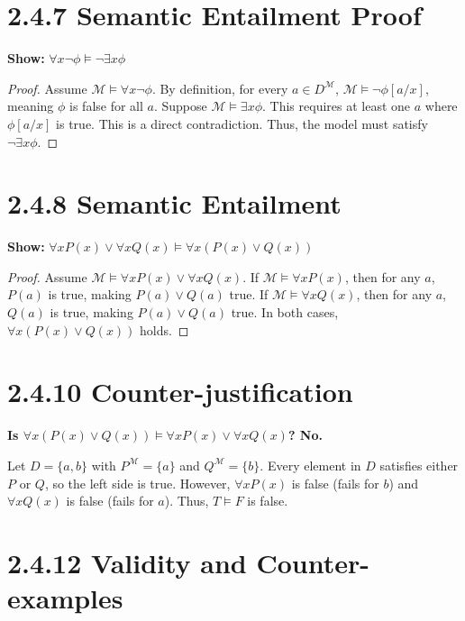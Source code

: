\documentclass[12pt]{article}
\begin{document}
\section*{{\color{tealblue} 2.4.7} Semantic Entailment Proof}
\textbf{Show:} $\forall x \neg \phi \models \neg \exists x \phi$

\begin{proof}
    Assume $\mathcal{M} \models \forall x \neg \phi$. By definition, for every $a \in D^{\mathcal{M}}$, $\mathcal{M} \models \neg \phi[a/x]$, meaning $\phi$ is false for all $a$. 
    Suppose $\mathcal{M} \models \exists x \phi$. This requires at least one $a$ where $\phi[a/x]$ is true. 
    This is a direct contradiction. Thus, the model must satisfy $\neg \exists x \phi$.
\end{proof}

\section*{{\color{tealblue} 2.4.8} Semantic Entailment}
\textbf{Show:} $\forall x P(x) \vee \forall x Q(x) \models \forall x (P(x) \vee Q(x))$

\begin{proof}
    Assume $\mathcal{M} \models \forall x P(x) \vee \forall x Q(x)$.
    If $\mathcal{M} \models \forall x P(x)$, then for any $a$, $P(a)$ is true, making $P(a) \vee Q(a)$ true.
    If $\mathcal{M} \models \forall x Q(x)$, then for any $a$, $Q(a)$ is true, making $P(a) \vee Q(a)$ true.
    In both cases, $\forall x (P(x) \vee Q(x))$ holds.
\end{proof}

\section*{{\color{tealblue} 2.4.10} Counter-justification}
\textbf{Is $\forall x (P(x) \vee Q(x)) \models \forall x P(x) \vee \forall x Q(x)$? No.}

\begin{tcolorbox}
    Let $D = \{a, b\}$ with $P^{\mathcal{M}} = \{a\}$ and $Q^{\mathcal{M}} = \{b\}$.
    Every element in $D$ satisfies either $P$ or $Q$, so the left side is true.
    However, $\forall x P(x)$ is false (fails for $b$) and $\forall x Q(x)$ is false (fails for $a$).
    Thus, $T \models F$ is false.
\end{tcolorbox}

\section*{{\color{tealblue} 2.4.12} Validity and Counter-examples}
\end{document}
